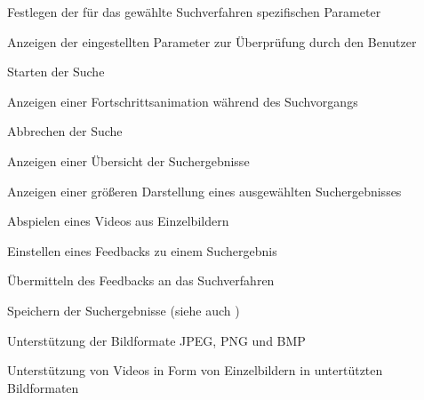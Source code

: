 \begin{description}
	\item[] Festlegen der für das gewählte Suchverfahren spezifischen Parameter
	\item[] Anzeigen der eingestellten Parameter zur Überprüfung durch den Benutzer
	\newline
	\item[] Starten der Suche
	\item[] Anzeigen einer Fortschrittsanimation während des Suchvorgangs
	\item[] Abbrechen der Suche
	\newline
	\item[] Anzeigen einer \"Ubersicht der Suchergebnisse
	\item[] Anzeigen einer größeren Darstellung eines ausgewählten Suchergebnisses
	\item[] Abspielen eines Videos aus Einzelbildern
	\item[] Einstellen eines Feedbacks zu einem Suchergebnis
	\item[] \"Ubermitteln des Feedbacks an das Suchverfahren
	\item[] Speichern der Suchergebnisse (siehe auch )
	\newline
	\item[] Unterstützung der Bildformate JPEG, PNG und BMP
	\item[] Unterstützung von Videos in Form von Einzelbildern in untert\"utzten Bildformaten
\end{description}

